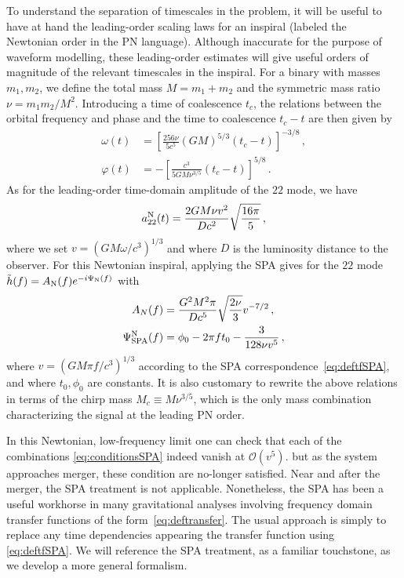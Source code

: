 \documentclass[aps,showpacs,twocolumn,
prd,superscriptaddress,nofootinbib]{revtex4-1}
\newcommand{\be}{\begin{equation}}
\newcommand{\ee}{\end{equation}}
\newcommand\calO{{\mathcal{O}}}
\newcommand{\Mchirp}{M_{c}}
\begin{document}
To understand the separation of timescales in the problem, it will be useful to have at hand the leading-order scaling laws for an inspiral (labeled the Newtonian order in the PN language). Although inaccurate for the purpose of waveform modelling, these leading-order estimates will give useful orders of magnitude of the relevant timescales in the inspiral. For a binary with masses $m_{1}, m_{2}$, we define the total mass $M=m_{1}+m_{2}$ and the symmetric mass ratio $\nu = m_{1}m_{2}/M^{2}$. Introducing a time of coalescence $t_{c}$, the relations between the orbital frequency and phase and the time to coalescence $t_{c} - t$ are then given by
\begin{subequations}\label{eq:omegaphiN}
\begin{align}
	\omega(t) &= \left[ \frac{256\nu}{5c^{5}} (GM)^{5/3} (t_{c}-t) \right]^{-3/8} \,, \\
	\varphi(t) &= -\left[ \frac{c^{3}}{5 G M \nu^{3/5}} (t_{c}-t) \right]^{5/8} \,.
\end{align}
\end{subequations}
As for the leading-order time-domain amplitude of the $22$ mode, we have~\cite{BlanchetLiving}
\be\label{eq:a22N}
	a_{22}^{\rm N} (t) = \frac{2 G M \nu v^{2}}{D c^{2}} \sqrt{\frac{16 \pi}{5}} \,,
\ee
where we set $v = (G M\omega/c^{3})^{1/3}$ and where $D$ is the luminosity distance to the observer. For this Newtonian inspiral, applying the SPA gives for the $22$ mode $\tilde{h}(f) = A_{\rm N}(f)e^{-i\Psi_{\rm N}(f)}$ with
\begin{subequations}\label{eq:SPAN}
\begin{align}
	A_{N}(f) &= \frac{G^{2}M^{2} \pi}{Dc^{5}} \sqrt{\frac{2\nu}{3}} v^{-7/2}\,, \label{eq:ASPAN}\\
	\Psi_{\rm SPA}^{\rm N}(f) &= \phi_{0} - 2\pi f t_{0} - \frac{3}{128\nu v^{5}} \,, \label{eq:PsiSPAN} 
\end{align}
\end{subequations}
where $v=(G M \pi f/c^{3})^{1/3}$ according to the SPA correspondence~\eqref{eq:deftfSPA}, and where $t_{0}, \phi_{0}$ are constants. It is also customary to rewrite the above relations in terms of the chirp mass $\Mchirp \equiv M\nu^{3/5}$, which is the only mass combination characterizing the signal at the leading PN order.

In this Newtonian, low-frequency limit one can check that each of the combinations \eqref{eq:conditionsSPA} indeed vanish at $\calO{(v^5)}$. but as the system approaches merger, these condition are no-longer satisfied. Near and after the merger, the SPA treatment is not applicable.
Nonetheless, the SPA has been a useful workhorse in many gravitational analyses involving frequency domain transfer functions of the form~\eqref{eq:deftransfer}. The usual approach is simply to replace any time dependencies appearing the transfer function using \eqref{eq:deftfSPA}. We will reference the SPA treatment, as a familiar touchstone, as we develop a more general formalism.
\end{document}
